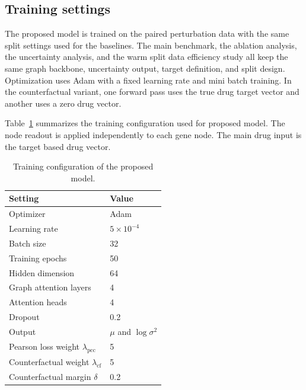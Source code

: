 \subsection{Training settings}
The proposed model is trained on the paired perturbation data with the same split settings used for the baselines. The main benchmark, the ablation analysis, the uncertainty analysis, and the warm split data efficiency study all keep the same graph backbone, uncertainty output, target definition, and split design. Optimization uses Adam with a fixed learning rate and mini batch training. In the counterfactual variant, one forward pass uses the true drug target vector and another uses a zero drug vector.

\noindent Table~\ref{tab:proposed_model_config} summarizes the training configuration used for proposed model. The node readout is applied independently to each gene node. The main drug input is the target based drug vector.

\begin{table}[htbp]
    \centering
    \caption[Proposed Model Configuration]{Training configuration of the proposed model.}
    \label{tab:proposed_model_config}
    \begin{tabular}{ll}
        \hline
        Setting & Value \\
        \hline
        Optimizer & Adam \\
        Learning rate & $5 \times 10^{-4}$ \\
        Batch size & 32 \\
        Training epochs & 50 \\
        Hidden dimension & 64 \\
        Graph attention layers & 4 \\
        Attention heads & 4 \\
        Dropout & 0.2 \\
        Output & $\mu$ and $\log \sigma^{2}$ \\
        Pearson loss weight $\lambda_{\mathrm{pcc}}$ & 5 \\
        Counterfactual weight $\lambda_{\mathrm{cf}}$ & 5 \\
        Counterfactual margin $\delta$ & 0.2 \\
        \hline
    \end{tabular}
\end{table}

